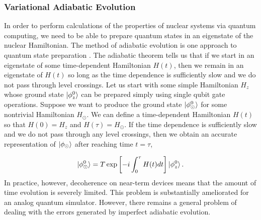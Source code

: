\documentclass[11pt]{article}
\begin{document}
\subsubsection{Variational Adiabatic Evolution}\label{sec_VAE}

In order to perform calculations of the properties of nuclear systems
via quantum computing, we need to be able to prepare quantum states in
an eigenstate of the nuclear Hamiltonian. The method of adiabatic
evolution is one approach to quantum state preparation
\cite{Farhi:2000a}.  The adiabatic theorem tells us that if we start
in an eigenstate of some time-dependent Hamiltonian $H(t)$, then we
remain in an eigenstate of $H(t)$ so long as the time dependence is
sufficiently slow and we do not pass through level crossings.  Let us
start with some simple Hamiltonian $H_z$ whose ground state
$\ket{\phi^0_z}$ can be prepared simply using single qubit gate
operations. Suppose we want to produce the ground state
$\ket{\phi^{0}_\odot}$ for some nontrivial Hamiltonian $H_\odot$.  We
can define a time-dependent Hamiltonian $H(t)$ so that $H(0)=H_z$ and
$H(\tau)=H_\odot$.  If the time dependence is sufficiently slow and we
do not pass through any level crossings, then we obtain an accurate
representation of $\ket{\phi_\odot}$ after reaching time $t = \tau$,

\begin{equation}
\ket{\phi_\odot^0} = T \exp\left[-i\int_0^\tau H(t) dt \right]\ket{\phi_z^{0}}.
\end{equation}  
In practice, however, decoherence on near-term devices means that the
amount of time evolution is severely limited.  This problem is
substantially ameliorated for an analog quantum simulator.  However,
there remains a general problem of dealing with the errors generated
by imperfect adiabatic evolution.
\end{document}

